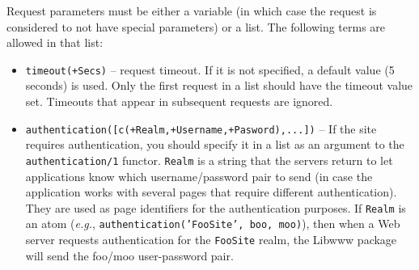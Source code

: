 Request parameters must be either a variable (in which case the request is
considered to not have special parameters) or a list. The following terms
are allowed in that list:
\begin{itemize}
  \item {\tt timeout(+Secs)} -- request timeout. If it is not specified, a
    default value (5 seconds) is used. Only the first request in a list
    should have the timeout value set. Timeouts that appear in subsequent
    requests are ignored.
  \item {\tt authentication([c(+Realm,+Username,+Pasword),...])} -- If the
    site requires authentication, you should specify it in a list as an
    argument to the {\tt authentication/1} functor. {\tt Realm} is a string
    that the servers return to let applications know which
    username/password pair to send (in case the application works with
    several pages that require different authentication). They are used as
    page identifiers for the authentication purposes. If {\tt Realm} is an
    atom ({\it e.g.}, {\tt authentication('FooSite', boo, moo)}), then when
    a Web server requests authentication for the {\tt FooSite} realm, the
    Libwww package will send the foo/moo user-password pair.


\end{itemize}
